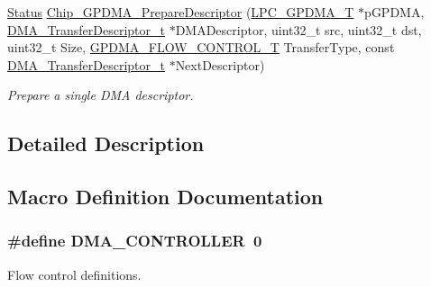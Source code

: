 \begin{DoxyCompactItemize}
\hyperlink{group__LPC__Types__Public__Types_ga67a0db04d321a74b7e7fcfd3f1a3f70b}{Status} \hyperlink{group__GPDMA__17XX__40XX_ga8605c52de33b7a8977eadaa480f5807c}{Chip\-\_\-\-G\-P\-D\-M\-A\-\_\-\-Prepare\-Descriptor} (\hyperlink{structLPC__GPDMA__T}{L\-P\-C\-\_\-\-G\-P\-D\-M\-A\-\_\-\-T} $\ast$p\-G\-P\-D\-M\-A, \hyperlink{group__GPDMA__17XX__40XX_ga23dbdf610f0d1f61ae30a69944bbee55}{D\-M\-A\-\_\-\-Transfer\-Descriptor\-\_\-t} $\ast$D\-M\-A\-Descriptor, uint32\-\_\-t src, uint32\-\_\-t dst, uint32\-\_\-t Size, \hyperlink{group__GPDMA__17XX__40XX_ga2cb59b641cd840f22780c44be1208133}{G\-P\-D\-M\-A\-\_\-\-F\-L\-O\-W\-\_\-\-C\-O\-N\-T\-R\-O\-L\-\_\-\-T} Transfer\-Type, const \hyperlink{group__GPDMA__17XX__40XX_ga23dbdf610f0d1f61ae30a69944bbee55}{D\-M\-A\-\_\-\-Transfer\-Descriptor\-\_\-t} $\ast$Next\-Descriptor)
\begin{DoxyCompactList}\small\item\em Prepare a single D\-M\-A descriptor. \end{DoxyCompactList}\end{DoxyCompactItemize}


\subsection{Detailed Description}


\subsection{Macro Definition Documentation}
\hypertarget{group__GPDMA__17XX__40XX_ga42385ba8b249b55d8a140a7c35f41c35}{
\subsubsection[{D\-M\-A\-\_\-\-C\-O\-N\-T\-R\-O\-L\-L\-E\-R}]{\setlength{\rightskip}{0pt plus 5cm}\#define D\-M\-A\-\_\-\-C\-O\-N\-T\-R\-O\-L\-L\-E\-R~0}}\label{group__GPDMA__17XX__40XX_ga42385ba8b249b55d8a140a7c35f41c35}


Flow control definitions. 

